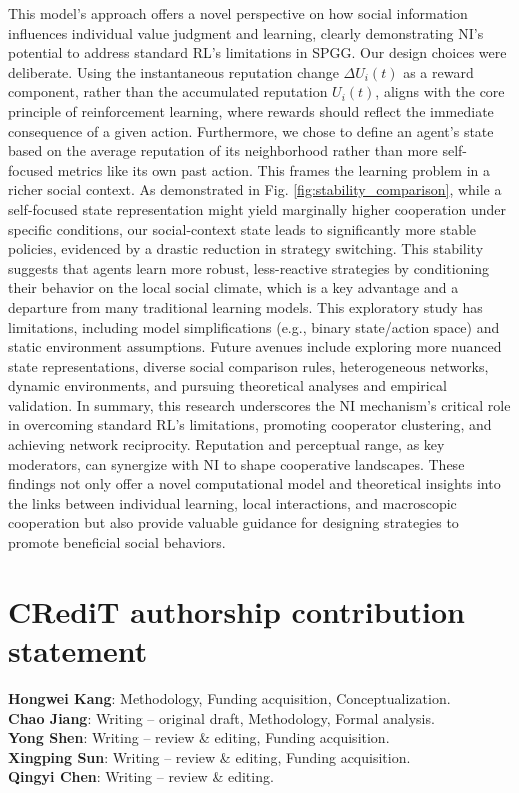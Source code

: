 \documentclass[preprint,number,sort&compress,12pt]{elsarticle}
\begin{document}
This model's approach offers a novel perspective on how social information influences individual value judgment and learning, clearly demonstrating NI's potential to address standard RL's limitations in SPGG. Our design choices were deliberate. Using the instantaneous reputation change $\Delta U_i(t)$ as a reward component, rather than the accumulated reputation $U_i(t)$, aligns with the core principle of reinforcement learning, where rewards should reflect the immediate consequence of a given action. Furthermore, we chose to define an agent's state based on the average reputation of its neighborhood rather than more self-focused metrics like its own past action. This frames the learning problem in a richer social context. As demonstrated in Fig. \ref{fig:stability_comparison}, while a self-focused state representation might yield marginally higher cooperation under specific conditions, our social-context state leads to significantly more stable policies, evidenced by a drastic reduction in strategy switching. This stability suggests that agents learn more robust, less-reactive strategies by conditioning their behavior on the local social climate, which is a key advantage and a departure from many traditional learning models. This exploratory study has limitations, including model simplifications (e.g., binary state/action space) and static environment assumptions. Future avenues include exploring more nuanced state representations, diverse social comparison rules, heterogeneous networks, dynamic environments, and pursuing theoretical analyses and empirical validation. In summary, this research underscores the NI mechanism's critical role in overcoming standard RL's limitations, promoting cooperator clustering, and achieving network reciprocity. Reputation and perceptual range, as key moderators, can synergize with NI to shape cooperative landscapes. These findings not only offer a novel computational model and theoretical insights into the links between individual learning, local interactions, and macroscopic cooperation but also provide valuable guidance for designing strategies to promote beneficial social behaviors.



\section*{CRediT authorship contribution statement}

\noindent 
\textbf{Hongwei Kang}: Methodology, Funding acquisition, Conceptualization. \\
\textbf{Chao Jiang}: Writing – original draft, Methodology, Formal analysis. \\
\textbf{Yong Shen}: Writing – review \& editing, Funding acquisition. \\
\textbf{Xingping Sun}: Writing – review \& editing, Funding acquisition. \\
\textbf{Qingyi Chen}: Writing – review \& editing.
\end{document}
